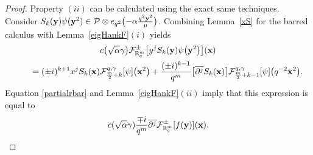\documentclass[pdftex]{sigma}
\newcommand{\mR}{\mathbb{R}}
\newcommand{\cF}{\mathcal{F}}
\newcommand{\cP}{\mathcal{P}}
\numberwithin{equation}{section}
\begin{document}
\begin{proof}
Property $(ii)$ can be calculated using the exact same techniques. Consider $S_k(\bold{y})\psi(\bold{y}^2)\in\cP\otimes e_{q^2}\big({-}\alpha\frac{q^2\bold{y}^2}{\mu}\big)$. Combining Lemma~\ref{xS} for the barred calculus with Lemma~\ref{eigHankF}$(i)$ yields
\begin{gather*}
c\big(\sqrt{\alpha}\gamma\big)\cF_{\mR_q^m}^{\pm }\big[y^jS_k(\bold{y})\psi\big(\bold{y}^2\big)\big](\bold{x})\\
 \qquad{} = (\pm i)^{k+1}x^jS_{k}(\bold{x})\cF^{q,\gamma}_{\frac{m}{2}+k}[\psi]\big(\bold{x}^2\big)
 + \frac{(\pm i)^{k-1}}{q^{m}}\big[\overline{\partial^j}S_{k}(\bold{x})\big]\cF^{q,\gamma}_{\frac{m}{2}+k-1}[\psi]\big(q^{-2}\bold{x}^2\big).
\end{gather*}
Equation \eqref{partialrbar} and Lemma~\ref{eigHankF}$(ii)$ imply that this expression is equal to
\[
c(\sqrt{\alpha}\gamma)\frac{\mp i}{q^m}\overline{\partial^j}\cF^{\pm}_{\mR_q^m}[f(\bold{y})](\bold{x}).
\]


\end{proof}
\end{document}
